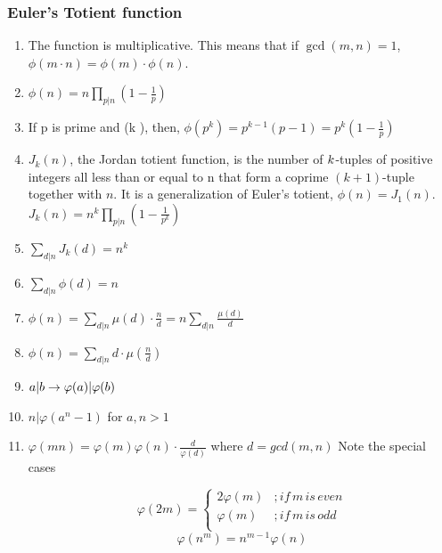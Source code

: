 \subsubsection{Euler’s Totient function}\begin{enumerate}

            
            \item The function is multiplicative.
                This means that if $\displaystyle \gcd(m, n) = 1$, $\displaystyle \phi(m \cdot n) = \phi(m) \cdot
                \phi(n)$.
            
            \item $\displaystyle \phi(n) = n\prod_{p |n}(1 - \frac{1}{p} )$
            \item If p is prime and (k ), then,
                $\displaystyle \phi(p^k) = p^{k - 1}(p - 1) = p^k(1 - \frac{1}{p})$
            \item $J_k(n)$, the Jordan totient function, is the number of $\displaystyle \displaystyle k$-tuples of
                positive
                integers all less than or equal to n that form a coprime $\displaystyle (k + 1)$-tuple together with
                $n$. It
                is
                a generalization of Euler’s totient, $\displaystyle \phi(n) = J_1(n)$. 
                \(J_k(n) = n^k\prod_{p |n}(1 - \frac{1}{p^k})\)
            \item $\displaystyle \sum_{d|n}J_k(d) = n^k$
            \item $\displaystyle \sum_{d|n}\phi(d) = n$
            \item $\displaystyle \phi(n) = \sum_{d|n}\mu(d)\cdot\frac{n}{d} = n\sum_{d|n}\frac{\mu(d)}{d}$
            \item 
                $\displaystyle \phi(n) = \sum_{d|n}d\cdot\mu(\frac{n}{d})$

            
            \item $\displaystyle \displaystyle {a}\vert{b} \to \varphi(a)\vert{\varphi(b)}$
            \item $n\vert{\varphi(a^n - 1)}$ for $\displaystyle a, n > 1$
            \item 
                $\displaystyle \varphi(mn)=\varphi(m)\varphi(n)\cdot\frac{d}{\varphi(d)}$ where $d=gcd(m, n)$
                    Note the special cases

                \[\varphi(2m)=
                \begin{cases}
                2\varphi(m) & ; if \, m \, is \, even\\
                \varphi(m) & ; if \, m \, is \, odd\\
                \end{cases}\]
                \[\displaystyle \varphi(n^m)=n^{m-1}\varphi(n)\]
            

\end{enumerate}
